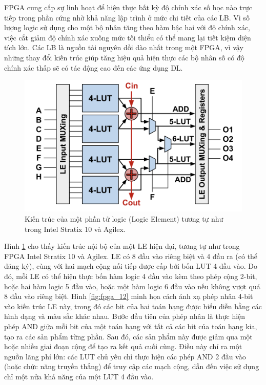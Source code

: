 \documentclass[a4paper]{article}
\begin{document}
FPGA cung cấp sự linh hoạt để hiện thực bất kỳ độ chính xác số học nào trực tiếp trong phần cứng nhờ khả năng lập trình ở mức chi tiết của các LB. Vì số lượng logic sử dụng cho một bộ nhân tăng theo hàm bậc hai với độ chính xác, việc cắt giảm độ chính xác xuống mức tối thiểu có thể mang lại tiết kiệm diện tích lớn. Các LB là nguồn tài nguyên dồi dào nhất trong một FPGA, vì vậy những thay đổi kiến trúc giúp tăng hiệu quả hiện thực các bộ nhân số có độ chính xác thấp sẽ có tác động cao đến các ứng dụng DL.
\begin{figure} [!h]
    \centering
    \includegraphics[width=0.75\linewidth]{assets/fpga_11.png}
    \caption{Kiến trúc của một phần tử logic (Logic Element) tương tự như trong Intel Stratix 10 và Agilex.}
    \label{fig:fpga_11}
\end{figure}
Hình \ref{fig:fpga_11} cho thấy kiến trúc nội bộ của một LE hiện đại, tương tự như trong FPGA Intel Stratix 10 và Agilex. LE có 8 đầu vào riêng biệt và 4 đầu ra (có thể đăng ký), cùng với hai mạch cộng nối tiếp được cấp bởi bốn LUT 4 đầu vào. Do đó, mỗi LE có thể hiện thực bốn hàm logic 4 đầu vào kèm theo phép cộng 2-bit, hoặc hai hàm logic 5 đầu vào, hoặc một hàm logic 6 đầu vào nếu không vượt quá 8 đầu vào riêng biệt. Hình \ref{fig:fpga_12} minh họa cách ánh xạ phép nhân 4-bit vào kiến trúc LE này, trong đó các bit của hai toán hạng được biểu diễn bằng các hình dạng và màu sắc khác nhau. Bước đầu tiên của phép nhân là thực hiện phép AND giữa mỗi bit của một toán hạng với tất cả các bit của toán hạng kia, tạo ra các sản phẩm từng phần. Sau đó, các sản phẩm này được giảm qua một hoặc nhiều giai đoạn cộng để tạo ra kết quả cuối cùng. Điều này chỉ ra một nguồn lãng phí lớn: các LUT chủ yếu chỉ thực hiện các phép AND 2 đầu vào (hoặc chức năng truyền thẳng) để truy cập các mạch cộng, dẫn đến việc sử dụng chỉ một nửa khả năng của một LUT 4 đầu vào.
\end{document}
